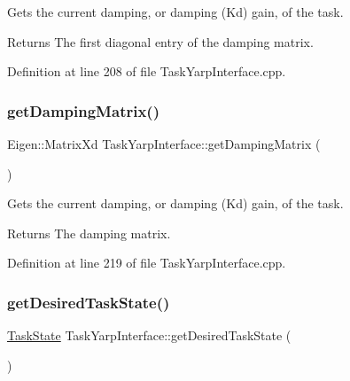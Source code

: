 Gets the current damping, or damping (Kd) gain, of the task.

\begin{DoxyReturn}{Returns}
The first diagonal entry of the damping matrix. 
\end{DoxyReturn}


Definition at line 208 of file Task\+Yarp\+Interface.\+cpp.

\hypertarget{classocra_1_1TaskYarpInterface_afdb2df2def4dec4067bd4696489a3b36}{}\label{classocra_1_1TaskYarpInterface_afdb2df2def4dec4067bd4696489a3b36} 
\subsubsection{\texorpdfstring{get\+Damping\+Matrix()}{getDampingMatrix()}}
{\footnotesize\ttfamily Eigen\+::\+Matrix\+Xd Task\+Yarp\+Interface\+::get\+Damping\+Matrix (\begin{DoxyParamCaption}{ }\end{DoxyParamCaption})}

Gets the current damping, or damping (Kd) gain, of the task.

\begin{DoxyReturn}{Returns}
The damping matrix. 
\end{DoxyReturn}


Definition at line 219 of file Task\+Yarp\+Interface.\+cpp.

\hypertarget{classocra_1_1TaskYarpInterface_ad41a96c26d189b6d5546f6a75a6fc4be}{}\label{classocra_1_1TaskYarpInterface_ad41a96c26d189b6d5546f6a75a6fc4be} 
\subsubsection{\texorpdfstring{get\+Desired\+Task\+State()}{getDesiredTaskState()}}
{\footnotesize\ttfamily \hyperlink{classocra_1_1TaskState}{Task\+State} Task\+Yarp\+Interface\+::get\+Desired\+Task\+State (\begin{DoxyParamCaption}{ }\end{DoxyParamCaption})}



